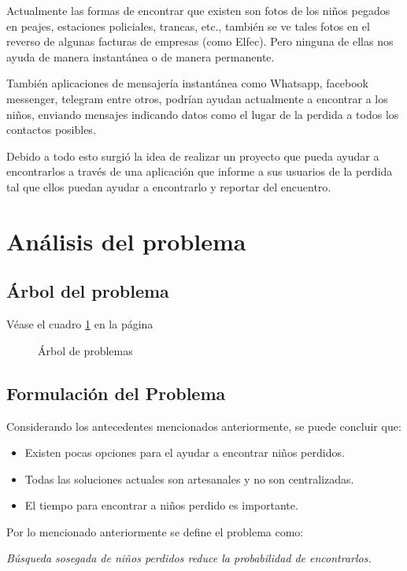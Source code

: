 \documentclass[letter,11pt,oneside,spanish]{article}
\begin{document}
Actualmente las formas de encontrar que existen son fotos de los niños pegados en 
peajes, estaciones policiales, trancas, etc., también se ve tales fotos en el reverso de 
algunas facturas de empresas (como Elfec). Pero ninguna de ellas nos ayuda de manera
instantánea o de manera permanente.

También aplicaciones de mensajería instantánea como Whatsapp, facebook messenger, telegram  entre otros,
podrían ayudan actualmente a encontrar a los niños, enviando mensajes indicando datos
como el lugar de la perdida a todos los contactos posibles.

Debido a todo esto surgió la idea de realizar un proyecto que pueda ayudar a 
encontrarlos a través de una aplicación que informe a sus usuarios de la 
perdida tal que ellos puedan ayudar a encontrarlo y reportar del encuentro.

\section{Análisis del problema}
\subsection{Árbol del problema}
Véase el cuadro \ref{arboldeproyecto} en la página \pageref{arboldeproyecto}

\begin{figure}
    \centering
    \def\svgwidth{\columnwidth}
    
    \caption{Árbol de problemas}
	\label{arboldeproyecto}
\end{figure}

\subsection{Formulación del Problema}
Considerando los antecedentes mencionados anteriormente, se puede concluir que:

\begin{itemize}
\item Existen pocas opciones para el ayudar a encontrar niños perdidos.
\item Todas las soluciones actuales son artesanales y no son centralizadas.
\item El tiempo para encontrar a niños perdido es importante.
\end{itemize}

Por lo mencionado anteriormente se define el problema como:

\emph{Búsqueda  sosegada de niños perdidos reduce la probabilidad de encontrarlos.}
\end{document}
